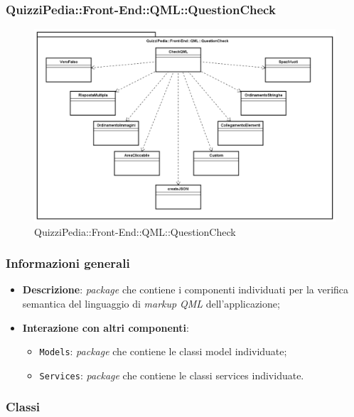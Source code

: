 \newpage
\subsubsection{QuizziPedia::Front-End::QML::QuestionCheck}


\begin{figure} [ht]
	\centering
	\includegraphics[scale=0.42]{UML/Package/QuizziPedia_Front-End_QML_QuestionCheck.png}
	\caption{QuizziPedia::Front-End::QML::QuestionCheck}
\end{figure} \FloatBarrier

\subsubsection{Informazioni generali}
\begin{itemize}
	\item \textbf{Descrizione}: \textit{package} che contiene i componenti individuati per la verifica semantica del linguaggio di \textit{markup} \textit{QML} dell'applicazione;
	\item \textbf{Interazione con altri componenti}:
	\begin{itemize}
		\item \texttt{Models}: \textit{package} che contiene le classi model individuate;
		\item \texttt{Services}: \textit{package} che contiene le classi services individuate.
	\end{itemize} 
\end{itemize}
\subsubsection{Classi}










